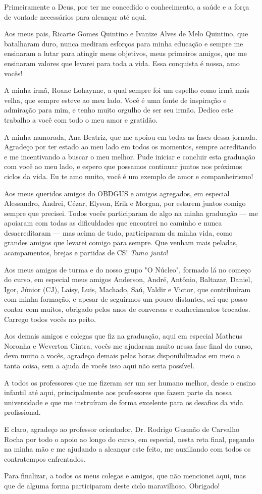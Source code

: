 Primeiramente a Deus, por ter me concedido o conhecimento, a saúde e a força de vontade necessários para alcançar até aqui.

Aos meus pais, Ricarte Gomes Quintino e Ivanize Alves de Melo Quintino, que batalharam duro, nunca mediram esforços para minha educação e sempre me ensinaram a lutar para atingir meus objetivos, meus primeiros amigos, que me ensinaram valores que levarei para toda a vida. Essa conquista é nossa, amo vocês!

A minha irmã, Roane Lohaynne, a qual sempre foi um espelho como irmã mais velha, que sempre esteve ao meu lado. Você é uma fonte de inspiração e admiração para mim, e tenho muito orgulho de ser seu irmão. Dedico este trabalho a você com todo o meu amor e gratidão.

A minha namorada, Ana Beatriz, que me apoiou em todas as fases dessa jornada. Agradeço por ter estado ao meu lado em todos os momentos, sempre acreditando e me incentivando a buscar o meu melhor. Pude iniciar e concluir esta graduação com você ao meu lado, e espero que possamos continuar juntos nos próximos ciclos da vida. Eu te amo muito, você é um exemplo de amor e companheirismo!

Aos meus queridos amigos do OBDGUS e amigos agregados, em especial Alessandro, Andrei, Cézar, Elyson, Erik e Morgan, por estarem juntos comigo sempre que precisei. Todos vocês participaram de algo na minha graduação — me apoiaram com todas as dificuldades que encontrei no caminho e nunca desacreditaram — mas acima de tudo, participaram da minha vida, como grandes amigos que levarei comigo para sempre. Que venham mais peladas, acampamentos, brejas e partidas de CS! \textit{Tamo junto}!

Aos meus amigos de turma e do nosso grupo "O Núcleo", formado lá no começo do curso, em especial meus amigos Anderson, André, Antônio, Baltazar, Daniel, Igor, Júnior (CJ), Laisy, Luis, Machado, Saú, Valdir e Victor, que contribuíram com minha formação, e apesar de seguirmos um pouco distantes, sei que posso contar com muitos, obrigado pelos anos de conversas e conhecimentos trocados. Carrego todos vocês no peito.

Aos demais amigos e colegas que fiz na graduação, aqui em especial Matheus Noronha e Weverton Cintra, vocês me ajudaram muito nessa fase final do curso, devo muito a vocês, agradeço demais pelas horas disponibilizadas em meio a tanta coisa, sem a ajuda de vocês isso aqui não seria possível.

A todos os professores que me fizeram ser um ser humano melhor, desde o ensino infantil até aqui, principalmente aos professores que fazem parte da nossa universidade e que me instruíram de forma excelente para os desafios da vida profissional.

E claro, agradeço ao professor orientador, Dr. Rodrigo Gusmão de Carvalho Rocha por todo o apoio ao longo do curso, em especial, nesta reta final, pegando na minha mão e me ajudando a alcançar este feito, me auxiliando com todos os contratempos enfrentados.

Para finalizar, a todos os meus colegas e amigos, que não mencionei aqui, mas que de alguma forma participaram deste ciclo maravilhoso. Obrigado!
